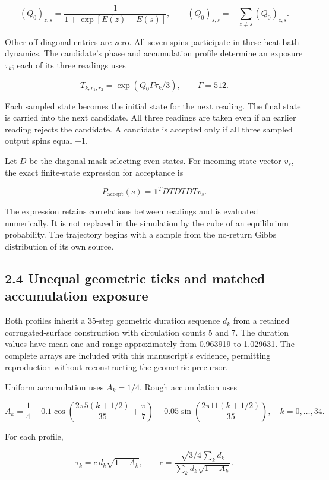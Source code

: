 \documentclass[
  11pt,
]{article}
\begin{document}
\[
(Q_0)_{z,s}=\frac{1}{1+\exp[E(z)-E(s)]},\qquad
(Q_0)_{s,s}=-\sum_{z\ne s}(Q_0)_{z,s}. \tag{6}
\]

Other off-diagonal entries are zero. All seven spins participate in
these heat-bath dynamics. The candidate's phase and accumulation profile
determine an exposure \(\tau_k\); each of its three readings uses

\[
T_{k,r_1,r_2}=\exp(Q_0\Gamma\tau_k/3),\qquad \Gamma=512. \tag{7}
\]

Each sampled state becomes the initial state for the next reading. The
final state is carried into the next candidate. All three readings are
taken even if an earlier reading rejects the candidate. A candidate is
accepted only if all three sampled output spins equal \(-1\).

Let \(D\) be the diagonal mask selecting even states. For incoming state
vector \(v_s\), the exact finite-state expression for acceptance is

\[
P_{\mathrm{accept}}(s)=\mathbf{1}^TDTDTDTv_s. \tag{8}
\]

The expression retains correlations between readings and is evaluated
numerically. It is not replaced in the simulation by the cube of an
equilibrium probability. The trajectory begins with a sample from the
no-return Gibbs distribution of its own source.

\subsection{2.4 Unequal geometric ticks and matched accumulation
exposure}\label{unequal-geometric-ticks-and-matched-accumulation-exposure}

Both profiles inherit a 35-step geometric duration sequence \(d_k\) from
a retained corrugated-surface construction with circulation counts 5 and
7. The duration values have mean one and range approximately from
0.963919 to 1.029631. The complete arrays are included with this
manuscript's evidence, permitting reproduction without reconstructing
the geometric precursor.

Uniform accumulation uses \(A_k=1/4\). Rough accumulation uses

\[
A_k=\frac14+0.1\cos\left(\frac{2\pi5(k+1/2)}{35}+\frac\pi7\right)
+0.05\sin\left(\frac{2\pi11(k+1/2)}{35}\right),\quad k=0,\ldots,34. \tag{9}
\]

For each profile,

\[
\tau_k=c\,d_k\sqrt{1-A_k},\qquad
c=\frac{\sqrt{3/4}\sum_kd_k}{\sum_kd_k\sqrt{1-A_k}}. \tag{10}
\]
\end{document}
